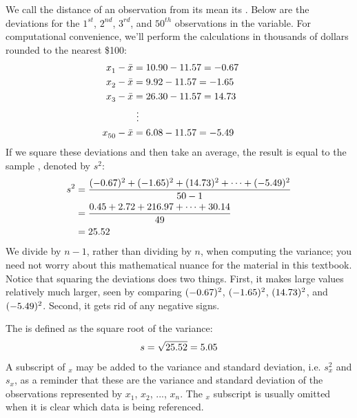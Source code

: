We call the distance of an observation from its mean its . Below are the deviations for the $1^{st}_{}$, $2^{nd}_{}$, $3^{rd}$, and $50^{th}_{}$ observations in the  variable.
For computational convenience, we'll perform the calculations
in thousands of dollars rounded to the nearest \$100:
\begin{align*}
x_1^{}-\bar{x} &= 10.90 - 11.57{} = -0.67 \hspace{5mm}\text{ } \\
x_2^{}-\bar{x} &= 9.92 - 11.57{} = -1.65 \\
x_3^{}-\bar{x} &= 26.30 - 11.57{} = 14.73 \\
			&\ \vdots \\
x_{50}^{}-\bar{x} &= 6.08 - 11.57{} = -5.49
\end{align*}
If we square these deviations and then take an average,
the result is equal to the sample
\label{varianceIsDefined},
denoted by $s_{}^2$:
\begin{align*}
s_{}^2 &= \frac{(-0.67)_{}^2 + (-1.65)_{}^2 + (14.73)_{}^2 + \cdots + (-5.49)_{}^2}{50{}-1} \\
	&= \frac{0.45 + 2.72 + 216.97 + \cdots + 30.14}{49} \\
	&= 25.52{}
\end{align*}
We divide by $n - 1$, rather than dividing by $n$,
when computing the variance;
you need not worry about this mathematical nuance
for the material in this textbook.
Notice that squaring the deviations does two things.
First, it makes large values relatively much larger,
seen by comparing $(-0.67)^2$, $(-1.65)^2$, $(14.73)^2$,
and $(-5.49)^2$.
Second, it gets rid of any negative signs.

The  is defined as the square root of the variance:
\begin{align*}
s = \sqrt{25.52{}} = 5.05{}
\end{align*}
A subscript of $_x$ may be added to the variance
and standard deviation,
i.e. $s_x^2$ and $s_x^{}$, as a reminder that these
are the variance and standard deviation of the observations
represented by $x_1^{}$, $x_2^{}$, ..., $x_n^{}$.
The $_{x}$ subscript is usually omitted when it is clear
which data is being referenced.

